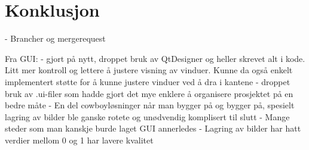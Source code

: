 \section{Konklusjon}
- Brancher og mergerequest

Fra GUI: 
- gjort på nytt, droppet bruk av QtDesigner og heller skrevet alt i kode. Litt mer kontroll og lettere å justere visning av vinduer. Kunne da også enkelt implementert støtte for å kunne justere vinduer ved å dra i kantene
- droppet bruk av .ui-filer som hadde gjort det mye enklere å organisere prosjektet på en bedre måte
- En del cowboyløsninger når man bygger på og bygger på, spesielt lagring av bilder ble ganske rotete og unødvendig komplisert til slutt
- Mange steder som man kanskje burde laget GUI annerledes
- Lagring av bilder har hatt verdier mellom 0 og 1 har lavere kvalitet